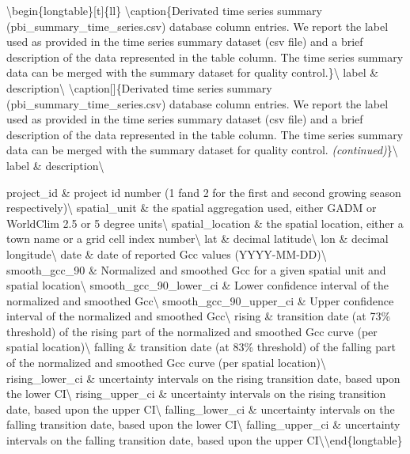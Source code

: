 \documentclass[
  landscape]{article}
\begin{document}
\textbackslash begin\{longtable\}{[}t{]}\{ll\}
\textbackslash caption\{\label{tab:unnamed-chunk-3}Derivated time series
summary (pbi\_summary\_time\_series.csv) database column entries. We
report the label used as provided in the time series summary dataset
(csv file) and a brief description of the data represented in the table
column. The time series summary data can be merged with the summary
dataset for quality control.\}\textbackslash{} \toprule label \&
description\textbackslash{} \midrule \endfirsthead
\textbackslash caption{[}{]}\{Derivated time series summary
(pbi\_summary\_time\_series.csv) database column entries. We report the
label used as provided in the time series summary dataset (csv file) and
a brief description of the data represented in the table column. The
time series summary data can be merged with the summary dataset for
quality control. \textit{(continued)}\}\textbackslash{} \toprule label
\& description\textbackslash{} \midrule \endhead

\endfoot
\bottomrule
\endlastfoot

project\_id \& project id number (1 fand 2 for the first and second
growing season respectively)\textbackslash{} spatial\_unit \& the
spatial aggregation used, either GADM or WorldClim 2.5 or 5 degree
units\textbackslash{} spatial\_location \& the spatial location, either
a town name or a grid cell index number\textbackslash{} lat \& decimal
latitude\textbackslash{} lon \& decimal longitude\textbackslash{}
\addlinespace date \& date of reported Gcc values
(YYYY-MM-DD)\textbackslash{} smooth\_gcc\_90 \& Normalized and smoothed
Gcc for a given spatial unit and spatial location\textbackslash{}
smooth\_gcc\_90\_lower\_ci \& Lower confidence interval of the
normalized and smoothed Gcc\textbackslash{} smooth\_gcc\_90\_upper\_ci
\& Upper confidence interval of the normalized and smoothed
Gcc\textbackslash{} rising \& transition date (at 73\% threshold) of the
rising part of the normalized and smoothed Gcc curve (per spatial
location)\textbackslash{} \addlinespace falling \& transition date (at
83\% threshold) of the falling part of the normalized and smoothed Gcc
curve (per spatial location)\textbackslash{} rising\_lower\_ci \&
uncertainty intervals on the rising transition date, based upon the
lower CI\textbackslash{} rising\_upper\_ci \& uncertainty intervals on
the rising transition date, based upon the upper CI\textbackslash{}
falling\_lower\_ci \& uncertainty intervals on the falling transition
date, based upon the lower CI\textbackslash{} falling\_upper\_ci \&
uncertainty intervals on the falling transition date, based upon the
upper CI\textbackslash* \textbackslash end\{longtable\}
\end{document}
